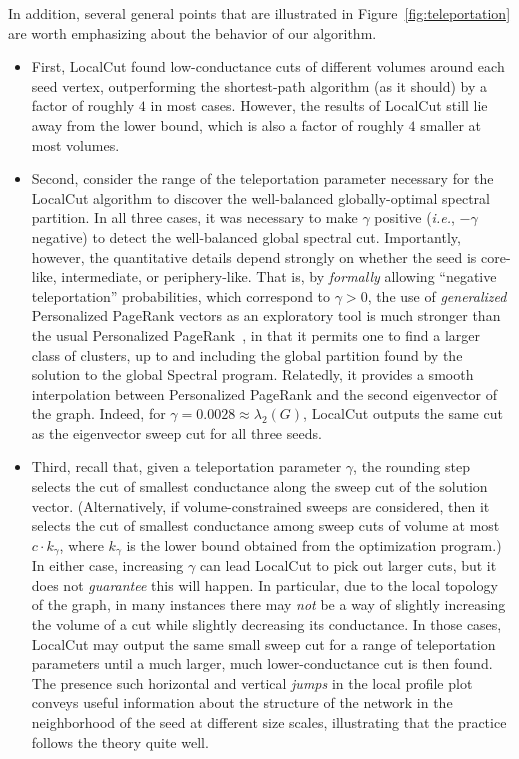 \documentclass[11pt]{article}
\begin{document}
\noindent
In addition, several general points that are illustrated in 
Figure~\ref{fig:teleportation} are worth emphasizing about the 
behavior of our algorithm.
\begin{itemize}
\item
First, \textsf{LocalCut} found low-conductance cuts of different volumes 
around each seed vertex, outperforming the shortest-path algorithm (as it 
should) by a factor of roughly $4$ in most cases. 
However, the results of \textsf{LocalCut} still lie away from the lower 
bound, which is also a factor of roughly $4$ smaller at most volumes. 
\item
Second, consider the range of the teleportation parameter necessary for the 
\textsf{LocalCut} algorithm to discover the well-balanced globally-optimal 
spectral partition.
In all three cases, it was necessary to make $\gamma$ positive 
(\emph{i.e.}, $-\gamma$ negative) to detect the well-balanced global 
spectral cut.
Importantly, however, the quantitative details depend strongly on whether the
seed is core-like, intermediate, or periphery-like.
That is, by \emph{formally} allowing ``negative teleportation'' 
probabilities, which correspond to $\gamma > 0$, the use of 
\emph{generalized} Personalized PageRank vectors as an exploratory tool is 
much stronger than the usual Personalized 
PageRank~\cite{andersen06local,andersen06seed}, in that it permits one to 
find a larger class of clusters, up to and including the global partition 
found by the solution to the global \textsf{Spectral} program.
Relatedly, it provides a smooth interpolation between Personalized PageRank
and the second eigenvector of the graph. 
Indeed, for $\gamma = 0.0028 \approx \lambda_2(G)$, \textsf{LocalCut} 
outputs the same cut as the eigenvector sweep cut for all three seeds.
\item
Third, recall that, given a teleportation parameter $\gamma$, the rounding 
step selects the cut of smallest conductance along the sweep cut of the 
solution vector.
(Alternatively, if volume-constrained sweeps are considered, then it selects 
the cut of smallest conductance among sweep cuts of volume at most 
$c \cdot k_\gamma$, where $k_\gamma$ is the lower bound obtained from the 
optimization program.)
In either case, increasing $\gamma$ can lead \textsf{LocalCut} 
to pick out larger cuts, but it does not \emph{guarantee} this will happen. 
In particular, due to the local topology of the graph, in many instances 
there may \emph{not} be a way of slightly increasing the volume of a cut 
while slightly decreasing its conductance. 
In those cases, \textsf{LocalCut} may output the same small sweep cut for a 
range of teleportation parameters until a much larger, much lower-conductance 
cut is then found.
The presence such horizontal and vertical \textit{jumps} in the local 
profile plot conveys useful information about the structure of the network 
in the neighborhood of the seed at different size scales, illustrating that 
the practice follows the theory quite well.
\end{itemize}
\end{document}

